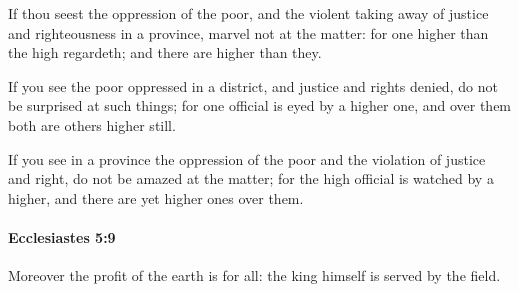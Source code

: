 			\begin{versebox}
					\item[BHS] 
					\item[LXX] 
					\item[ASV] If thou seest the oppression of the poor, and the violent taking away of justice and righteousness in a province, marvel not at the matter: for one higher than the high regardeth; and there are higher than they.
					\item[NIV] If you see the poor oppressed in a district, and justice and rights denied, do not be surprised at such things; for one official is eyed by a higher one, and over them both are others higher still.
					\item[NRSV] If you see in a province the oppression of the poor and the violation of justice and right, do not be amazed at the matter; for the high official is watched by a higher, and there are yet higher ones over them.
			\end{versebox}

		\paragraph{Ecclesiastes 5:9} %
			\label{ECCLESIASTES-5-9}

			Moreover the profit of the earth is for all: the king himself is served by the field.

